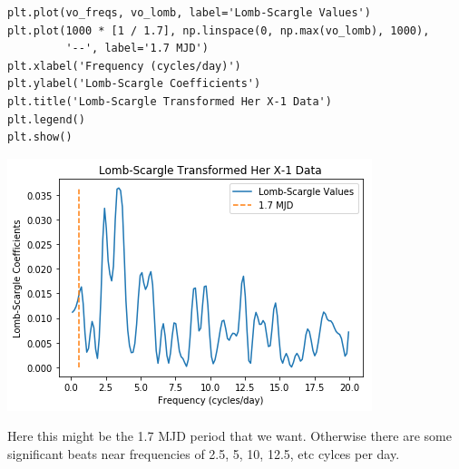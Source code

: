 \documentclass[11pt]{article}
\begin{document}
\begin{verbatim}
plt.plot(vo_freqs, vo_lomb, label='Lomb-Scargle Values')
plt.plot(1000 * [1 / 1.7], np.linspace(0, np.max(vo_lomb), 1000),
         '--', label='1.7 MJD')
plt.xlabel('Frequency (cycles/day)')
plt.ylabel('Lomb-Scargle Coefficients')
plt.title('Lomb-Scargle Transformed Her X-1 Data')
plt.legend()
plt.show()
\end{verbatim}

\includegraphics[width=.9\linewidth]{./obipy-resources/333srD.png}

Here this might be the 1.7 MJD period that we want. Otherwise there are some
significant beats near frequencies of 2.5, 5, 10, 12.5, etc cylces per day.
\end{document}
